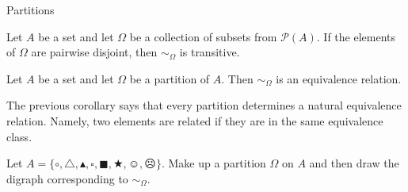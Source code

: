 \begin{section}{Partitions}
\begin{theorem}[*]
Let $A$ be a set and let $\Omega$ be a collection of subsets from $\mathcal{P}(A)$.  If the elements of $\Omega$ are pairwise disjoint, then $\sim_{\Omega}$ is transitive.
\end{theorem}

\begin{corollary}[*]
Let $A$ be a set and let $\Omega$ be a partition of $A$.  Then $\sim_{\Omega}$ is an equivalence relation.
\end{corollary}

\begin{remark}
The previous corollary says that every partition determines a natural equivalence relation.  Namely, two elements are related if they are in the same equivalence class.
\end{remark}

\begin{exercise}
Let $A=\{\circ, \triangle, \blacktriangle, \square, \blacksquare, \bigstar, \smiley, \frownie\}$.  Make up a partition $\Omega$ on $A$ and then draw the digraph corresponding to $\sim_{\Omega}$.
\end{exercise}

\end{section}
